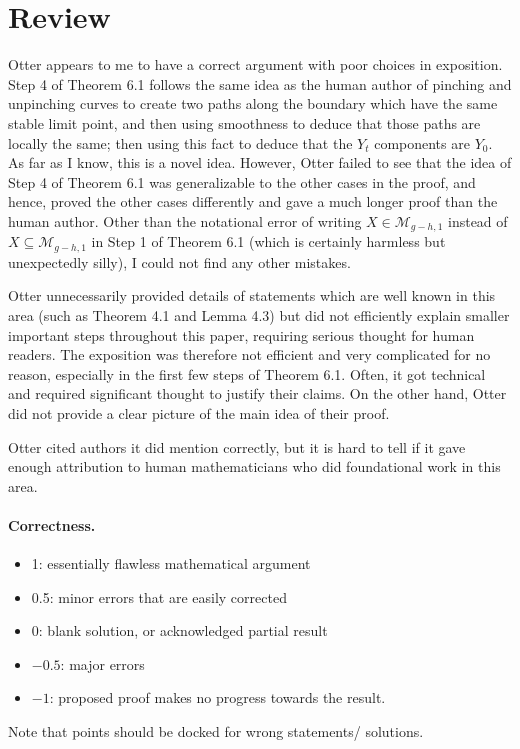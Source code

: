 \documentclass[11pt]{article}
\newcommand{\M}{\mathcal M}
\theoremstyle{remark}
\begin{document}
\maketitle

\section{Review}
Otter appears to me to have a correct argument with poor choices in exposition. Step 4 of Theorem 6.1 follows the same idea as the human author of pinching and unpinching curves to create two paths along the boundary which have the same stable limit point, and then using smoothness to deduce that those paths are locally the same; then using this fact to deduce that the $Y_t$ components are $Y_0$. As far as I know, this is a novel idea. However, Otter failed to see that the idea of Step 4 of Theorem 6.1 was generalizable to the other cases in the proof, and hence, proved the other cases differently and gave a much longer proof than the human author. Other than the notational error of writing $X\in\M_{g-h,1}$ instead of $X\subseteq\M_{g-h,1}$ in Step 1 of Theorem 6.1 (which is certainly harmless but unexpectedly silly), I could not find any other mistakes.

Otter unnecessarily provided details of statements which are well known in this area (such as Theorem 4.1 and Lemma 4.3) but did not efficiently explain smaller important steps throughout this paper, requiring serious thought for human readers. The exposition was therefore not efficient and very complicated for no reason, especially in the first few steps of Theorem 6.1. Often, it got technical and required significant thought to justify their claims. On the other hand, Otter did not provide a clear picture of the main idea of their proof. 

Otter cited authors it did mention correctly, but it is hard to tell if it gave enough attribution to human mathematicians who did foundational work in this area. 


\paragraph{Correctness.}
\begin{itemize}
	\item  1: essentially flawless mathematical argument
	\item  0.5: minor errors that are easily corrected
	\item  0: blank solution, or acknowledged partial result
	\item  $-0.5$: major errors
	\item  $-1$: proposed proof makes no progress towards the result.
\end{itemize}
Note that points should be docked for wrong statements/ solutions.
\end{document}
